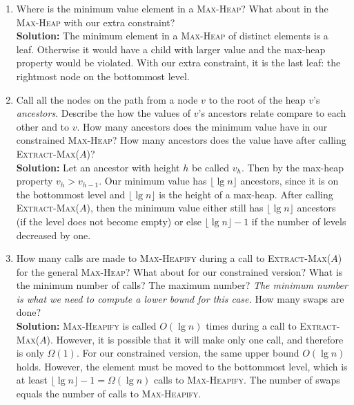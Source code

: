 \documentclass[letterpaper,11pt]{article}
\begin{document}
\begin{enumerate}
\begin{enumerate}
{\bf Solution:} The number of swaps is equivalent to the number of times \textsc{Max-Heapify} is called. This seems to be the most expensive operation. We call it $n$ times, so if a constant fraction of these calls make $\Omega(\lg n)$ swaps, then we have shown the result!\\

\item Where is the minimum value element in a \textsc{Max-Heap}? What about in the \textsc{Max-Heap} with our extra constraint?\\

{\bf Solution:} The minimum element in a \textsc{Max-Heap} of distinct elements is a leaf. Otherwise it would have a child with larger value and the max-heap property would be violated. With our extra constraint, it is the last leaf: the rightmost node on the bottommost level.\\

\item Call all the nodes on the path from a node $v$ to the root of the heap $v$'s \emph{ancestors}. Describe the how the values of $v$'s ancestors relate compare to each other and to $v$. How many ancestors does the minimum value have in our constrained \textsc{Max-Heap}? How many ancestors does the value have after calling \textsc{Extract-Max}($A$)?\\

{\bf Solution:} Let an ancestor with height $h$ be called $v_h$. Then by the max-heap property $v_h > v_{h-1}$. Our minimum value has $\lfloor \lg n \rfloor$ ancestors, since it is on the bottommost level and $\lfloor \lg n \rfloor$ is the height of a max-heap. After calling \textsc{Extract-Max}($A$), then the minimum value either still has $\lfloor \lg n \rfloor$ ancestors (if the level does not become empty) or else $\lfloor \lg n \rfloor -1$ if the number of levels decreased by one.\\

\item How many calls are made to \textsc{Max-Heapify} during a call to \textsc{Extract-Max}($A$) for the general \textsc{Max-Heap}? What about for our constrained version? What is the minimum number of calls? The maximum number? \emph{The minimum number is what we need to compute a lower bound for this case.} How many swaps are done?\\

{\bf Solution:} \textsc{Max-Heapify} is called $O(\lg n)$ times during a call to \textsc{Extract-Max}($A$). However, it is possible that it will make only one call, and therefore is only $\Omega(1)$. For our constrained version, the same upper bound $O(\lg n)$ holds. However, the element must be moved to the bottommost level, which is at least $\lfloor \lg n \rfloor -1 = \Omega(\lg n)$ calls to \textsc{Max-Heapify}. The number of swaps equals the number of calls to \textsc{Max-Heapify}.\\


\end{enumerate}
\end{enumerate}
\end{document}
